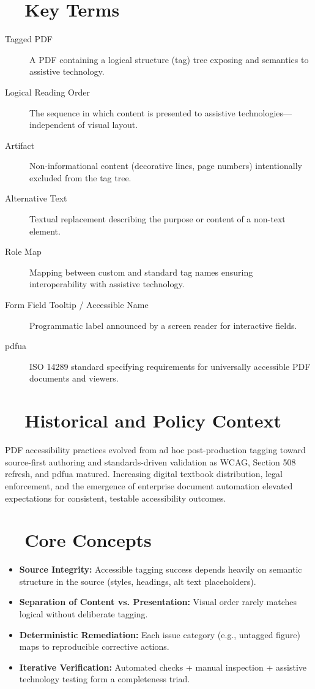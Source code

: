 \section{~~Key Terms}\label{ch17:sec:key-terms}
\begin{description}
	\item[Tagged PDF] A PDF containing a logical structure (tag) tree exposing  and semantics to assistive technology.
	\item[Logical Reading Order] The sequence in which content is presented to assistive technologies—independent of visual layout.
	\item[Artifact] Non-informational content (decorative lines, page numbers) intentionally excluded from the tag tree.
	\item[Alternative Text] Textual replacement describing the purpose or content of a non-text element.
	\item[Role Map] Mapping between custom and standard tag names ensuring interoperability with assistive technology.
	\item[Form Field Tooltip / Accessible Name] Programmatic label announced by a screen reader for interactive fields.
	\item[\gls{pdfua}] ISO 14289 standard specifying requirements for universally accessible PDF documents and viewers.
\end{description}

\section{~~Historical and Policy Context}\label{ch17:sec:historical-policy}
PDF accessibility practices evolved from ad hoc post-production tagging toward source-first authoring and standards-driven validation as WCAG, Section 508 refresh, and \gls{pdfua} matured. Increasing digital textbook distribution, legal enforcement, and the emergence of enterprise document automation elevated expectations for consistent, testable accessibility outcomes.

\section{~~Core Concepts}\label{ch17:sec:core-concepts}
\begin{itemize}
	\item \textbf{Source Integrity:} Accessible tagging success depends heavily on semantic structure in the source (styles, headings, alt text placeholders).
	\item \textbf{Separation of Content vs. Presentation:} Visual order rarely matches logical  without deliberate tagging.
	\item \textbf{Deterministic Remediation:} Each issue category (e.g., untagged figure) maps to reproducible corrective actions.
	\item \textbf{Iterative Verification:} Automated checks + manual inspection + assistive technology testing form a completeness triad.
\end{itemize}

